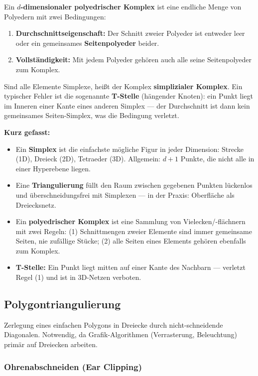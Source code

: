 \documentclass[12pt, a4paper]{article}
\begin{document}
Ein \textbf{$d$-dimensionaler polyedrischer Komplex} ist eine endliche Menge von Polyedern mit zwei Bedingungen:
\begin{enumerate}
  \item \textbf{Durchschnittseigenschaft:} Der Schnitt zweier Polyeder ist entweder leer oder ein gemeinsames \textbf{Seitenpolyeder} beider.
  \item \textbf{Vollständigkeit:} Mit jedem Polyeder gehören auch alle seine Seitenpolyeder zum Komplex.
\end{enumerate}

Sind alle Elemente Simplexe, heißt der Komplex \textbf{simplizialer Komplex}. Ein typischer Fehler ist die sogenannte \textbf{T-Stelle} (hängender Knoten): ein Punkt liegt im Inneren einer Kante eines anderen Simplex — der Durchschnitt ist dann kein gemeinsames Seiten-Simplex, was die Bedingung verletzt.

\textbf{Kurz gefasst:}
\begin{itemize}
  \item Ein \textbf{Simplex} ist die einfachste mögliche Figur in jeder Dimension: Strecke (1D), Dreieck (2D), Tetraeder (3D). Allgemein: $d+1$ Punkte, die nicht alle in einer Hyperebene liegen.
  \item Eine \textbf{Triangulierung} füllt den Raum zwischen gegebenen Punkten lückenlos und überschneidungsfrei mit Simplexen — in der Praxis: Oberfläche als Dreiecksnetz.
  \item Ein \textbf{polyedrischer Komplex} ist eine Sammlung von Vielecken/-flächnern mit zwei Regeln: (1) Schnittmengen zweier Elemente sind immer gemeinsame Seiten, nie zufällige Stücke; (2) alle Seiten eines Elements gehören ebenfalls zum Komplex.
  \item \textbf{T-Stelle:} Ein Punkt liegt mitten auf einer Kante des Nachbarn — verletzt Regel (1) und ist in 3D-Netzen verboten.
\end{itemize}

\subsection{Polygontriangulierung}

Zerlegung eines einfachen Polygons in Dreiecke durch nicht-schneidende Diagonalen. Notwendig, da Grafik-Algorithmen (Verrasterung, Beleuchtung) primär auf Dreiecken arbeiten.

\subsubsection*{Ohrenabschneiden (Ear Clipping)}
\end{document}
